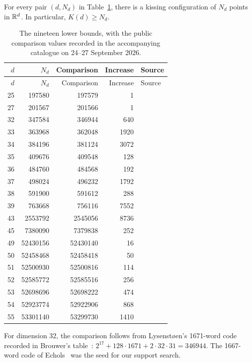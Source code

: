 \begin{theorem}\label{thm:main}
For every pair $(d,N_d)$ in Table~\ref{tab:main}, there is a kissing
configuration of $N_d$ points in $\mathbb R^d$. In particular, $K(d)\ge N_d$.
\end{theorem}

\begin{longtable}{rrrrl}
\caption{The nineteen lower bounds, with the public comparison values
recorded in the accompanying catalogue on 24--27 September 2026.}
\label{tab:main}\\
\toprule
$d$&$N_d$&Comparison&Increase&Source\\\midrule
\endfirsthead
\toprule $d$&$N_d$&Comparison&Increase&Source\\\midrule\endhead
25&197580&197579&1&\cite{kissingnumbers}\\
27&201567&201566&1&\cite{lindow27}\\
32&347584&346944&640&\cite{brouwer}\\
33&363968&362048&1920&\cite{brouwer,echols}\\
34&384196&381124&3072&\cite{brouwer,echols}\\
35&409676&409548&128&\cite{brouwer}\\
36&484760&484568&192&\cite{brouwer}\\
37&498024&496232&1792&\cite{brouwer,echols}\\
38&591900&591612&288&\cite{kissingnumbers}\\
39&763668&756116&7552&\cite{kissingnumbers}\\
43&2553792&2545056&8736&\cite{crosssections}\\
45&7380090&7379838&252&\cite{crosssections}\\
49&52430156&52430140&16&\cite{kissingnumbers}\\
50&52458468&52458418&50&\cite{kissingnumbers}\\
51&52500930&52500816&114&\cite{kissingnumbers}\\
52&52585772&52585516&256&\cite{kissingnumbers}\\
53&52698696&52698222&474&\cite{kissingnumbers}\\
54&52923774&52922906&868&\cite{kissingnumbers}\\
55&53301140&53299730&1410&\cite{kissingnumbers}\\\bottomrule
\end{longtable}

For dimension 32, the comparison follows from Lysenst\o en's
1671-word code recorded in Brouwer's table~\cite{brouwer}:
$2^{17}+128\cdot1671+2\cdot32\cdot31=346944$.
The 1667-word code of Echols~\cite{echols} was the seed for our support search.

